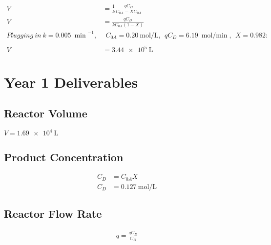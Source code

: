 \documentclass[letterpaper, 12pt]{article}
\begin{document}
\begin{align*}
	V &= \frac{1}{k}\frac{qC_D}{C_{0A} - XC_{0A}} \\
	V &= \frac{qC_D}{kC_{0A}(1 - X)} \\
	Plugging\ in\ k = \SI{0.005}{\min}^{-1},&\ \
	C_{0A} = \SI{0.20}{\mole\per\liter},\ \
	qC_D = \SI{6.19}{\mole\per\min},\ \
	X = 0.982: \\
	\\
	V &= \SI{3.44e5}{\liter}
\end{align*}
\section{Year 1 Deliverables}
\subsection{Reactor Volume}
$V = \SI{1.69e4}{\liter}$
\subsection{Product Concentration}
\begin{align*}
	C_D &= C_{0A}X \\
	C_D &= \SI{0.127}{\mole\per\liter}
\end{align*}
\subsection{Reactor Flow Rate}
\begin{align*}
	q = \frac{qC_D}{C_D}
\end{align*}
\end{document}
